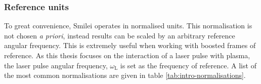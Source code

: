 
\subsubsection{Reference units}
To great convenience, Smilei operates in normalised units. This normalisation is not chosen \textit{a priori}, instead results can be scaled by an arbitrary reference angular frequency. This is extremely useful when working with boosted frames of reference. As this thesis focuses on the interaction of a laser pulse with plasma, the laser pulse angular frequency, $\omega_\mathrm{L}$ is set as the frequency of reference. A list of the most common normalisations are given in table \ref{tab:intro-normalisations}.

